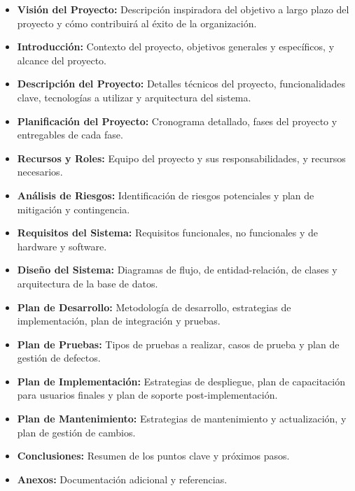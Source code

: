 \documentclass{article}
\begin{document}
\begin{itemize}
    \item \textbf{Visión del Proyecto:} Descripción inspiradora del objetivo a largo plazo del proyecto y cómo contribuirá al éxito de la organización.
    \item \textbf{Introducción:} Contexto del proyecto, objetivos generales y específicos, y alcance del proyecto.
    \item \textbf{Descripción del Proyecto:} Detalles técnicos del proyecto, funcionalidades clave, tecnologías a utilizar y arquitectura del sistema.
    \item \textbf{Planificación del Proyecto:} Cronograma detallado, fases del proyecto y entregables de cada fase.
    \item \textbf{Recursos y Roles:} Equipo del proyecto y sus responsabilidades, y recursos necesarios.
    \item \textbf{Análisis de Riesgos:} Identificación de riesgos potenciales y plan de mitigación y contingencia.
    \item \textbf{Requisitos del Sistema:} Requisitos funcionales, no funcionales y de hardware y software.
    \item \textbf{Diseño del Sistema:} Diagramas de flujo, de entidad-relación, de clases y arquitectura de la base de datos.
    \item \textbf{Plan de Desarrollo:} Metodología de desarrollo, estrategias de implementación, plan de integración y pruebas.
    \item \textbf{Plan de Pruebas:} Tipos de pruebas a realizar, casos de prueba y plan de gestión de defectos.
    \item \textbf{Plan de Implementación:} Estrategias de despliegue, plan de capacitación para usuarios finales y plan de soporte post-implementación.
    \item \textbf{Plan de Mantenimiento:} Estrategias de mantenimiento y actualización, y plan de gestión de cambios.
    \item \textbf{Conclusiones:} Resumen de los puntos clave y próximos pasos.
    \item \textbf{Anexos:} Documentación adicional y referencias.
\end{itemize}

\newpage
\end{document}
